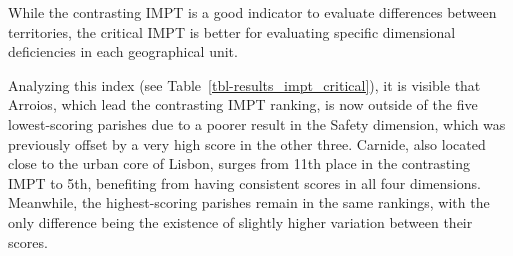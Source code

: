\documentclass[
  authoryear,
  review,
  1p]{elsarticle}
\begin{document}
While the contrasting IMPT is a good indicator to evaluate differences
between territories, the critical IMPT is better for evaluating specific
dimensional deficiencies in each geographical unit.

Analyzing this index (see Table~\ref{tbl-results_impt_critical}), it is
visible that Arroios, which lead the contrasting IMPT ranking, is now
outside of the five lowest-scoring parishes due to a poorer result in
the Safety dimension, which was previously offset by a very high score
in the other three. Carnide, also located close to the urban core of
Lisbon, surges from 11th place in the contrasting IMPT to 5th,
benefiting from having consistent scores in all four dimensions.
Meanwhile, the highest-scoring parishes remain in the same rankings,
with the only difference being the existence of slightly higher
variation between their scores.
\end{document}
